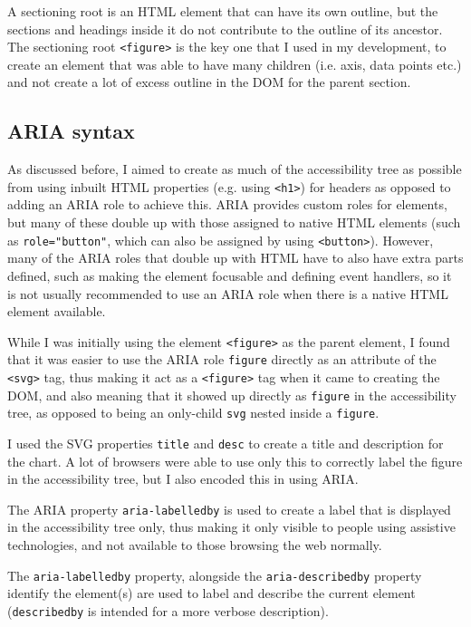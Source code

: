 \documentclass[ %
                    author={Aleena Baig},
                supervisor={Dr Simon Lock},
                    degree={BSc},
                     title={On Making Web Accessible Graphs},
                  subtitle={},
                      year={2019} ]{dissertation}
\begin{document}
A sectioning root is an HTML element that can have its own outline, but the sections and headings inside it do not contribute to the outline of its ancestor. The sectioning root \texttt{<figure>} is the key one that I used in my development, to create an element that was able to have many children (i.e. axis, data points etc.) and not create a lot of excess outline in the DOM for the parent section.


\subsection{ARIA syntax}

As discussed before, I aimed to create as much of the accessibility tree as possible from using inbuilt HTML properties (e.g. using \texttt{<h1>}) for headers as opposed to adding an ARIA role to achieve this. ARIA provides custom roles for elements, but many of these double up with those assigned to native HTML elements (such as \texttt{role="button"}, which can also be assigned by using \texttt{<button>}). However, many of the ARIA roles that double up with HTML have to also have extra parts defined, such as making the element focusable and defining event handlers, so it is not usually recommended to use an ARIA role when there is a native HTML element available.

While I was initially using the element \texttt{<figure>} as the parent element, I found that it was easier to use the ARIA role \texttt{figure} directly as an attribute of the \texttt{<svg>} tag, thus making it act as a \texttt{<figure>} tag when it came to creating the DOM, and also meaning that it showed up directly as \texttt{figure} in the accessibility tree, as opposed to being an only-child \texttt{svg} nested inside a \texttt{figure}.

I used the SVG properties \texttt{title} and \texttt{desc} to create a title and description for the chart. A lot of browsers were able to use only this to correctly label the figure in the accessibility tree, but I also encoded this in using ARIA.

The ARIA property \texttt{aria-labelledby} is used to create a label that is displayed in the accessibility tree only, thus making it only visible to people using assistive technologies, and not available to those browsing the web normally.

The \texttt{aria-labelledby} property, alongside the \texttt{aria-describedby} property identify the element(s) are used to label and describe the current element (\texttt{describedby} is intended for a more verbose description).
\end{document}
